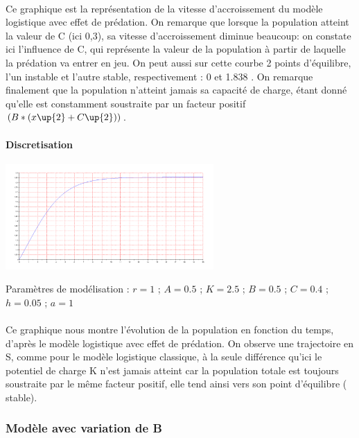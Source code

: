 \documentclass{article}
\begin{document}
\paragraph{}
Ce graphique est la représentation de la vitesse d'accroissement du modèle logistique avec effet de prédation.
On remarque que lorsque la population atteint la valeur de C (ici 0,3), sa vitesse d'accroissement diminue beaucoup: on constate ici l'influence de C, qui représente la valeur de la population à partir de laquelle la prédation va entrer en jeu.
On peut aussi sur cette courbe 2 points d'équilibre, l'un instable et l'autre stable, respectivement : 0 et 1.838 .
On remarque finalement que la population n'atteint jamais sa capacité de charge, étant donné qu'elle est constamment soustraite par un facteur positif $( B * (x\up{2} +C\up{2}))$.

\paragraph{Discretisation}
\begin{center}
\includegraphics[width=300px]{img/part2/Traj.png}
\end{center}
Paramètres de modélisation : $r=1$ ; $A=0.5$ ; $K=2.5$ ; $B=0.5$ ; $C=0.4$ ; $h=0.05$ ; $a=1$
\paragraph{}
Ce graphique nous montre l'évolution de la population en fonction du temps, d'après le modèle logistique avec effet de prédation. On observe une trajectoire en S, comme pour le modèle logistique classique, à la seule différence qu'ici le potentiel de charge K n'est jamais atteint car la population totale est toujours soustraite par le même facteur positif, elle tend ainsi vers son point d'équilibre ( stable).

\subsubsection{Modèle avec variation de B}
\end{document}
